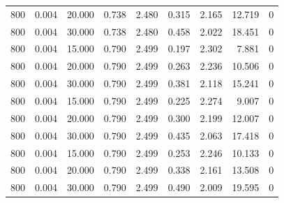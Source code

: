 \begin{tabular}{rrrrrrrrr}
800 & 0.004 & 20.000 & 0.738 & 2.480 & 0.315 & 2.165 & 12.719 & 0 \\
800 & 0.004 & 30.000 & 0.738 & 2.480 & 0.458 & 2.022 & 18.451 & 0 \\
800 & 0.004 & 15.000 & 0.790 & 2.499 & 0.197 & 2.302 & 7.881 & 0 \\
800 & 0.004 & 20.000 & 0.790 & 2.499 & 0.263 & 2.236 & 10.506 & 0 \\
800 & 0.004 & 30.000 & 0.790 & 2.499 & 0.381 & 2.118 & 15.241 & 0 \\
800 & 0.004 & 15.000 & 0.790 & 2.499 & 0.225 & 2.274 & 9.007 & 0 \\
800 & 0.004 & 20.000 & 0.790 & 2.499 & 0.300 & 2.199 & 12.007 & 0 \\
800 & 0.004 & 30.000 & 0.790 & 2.499 & 0.435 & 2.063 & 17.418 & 0 \\
800 & 0.004 & 15.000 & 0.790 & 2.499 & 0.253 & 2.246 & 10.133 & 0 \\
800 & 0.004 & 20.000 & 0.790 & 2.499 & 0.338 & 2.161 & 13.508 & 0 \\
800 & 0.004 & 30.000 & 0.790 & 2.499 & 0.490 & 2.009 & 19.595 & 0 \\
\bottomrule
\end{tabular}
